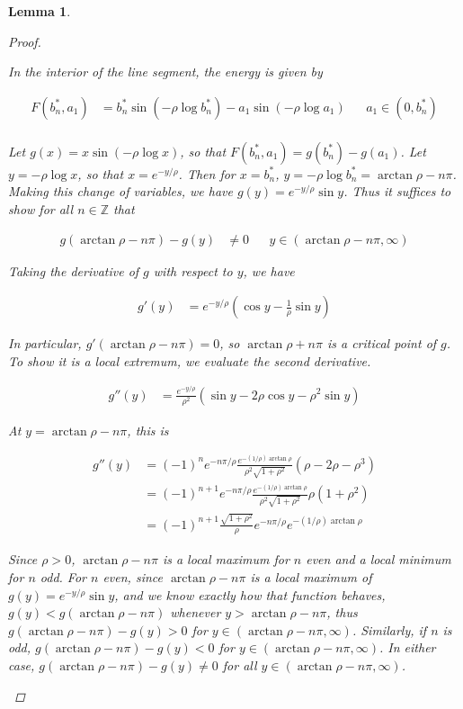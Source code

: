 \documentclass[12pt]{article}
\def\Z{{\mathbb Z}}
\newtheorem{lemma}{Lemma}
\begin{document}
\begin{lemma}
\begin{proof}
\begin{enumerate}
In the interior of the line segment, the energy is given by

\begin{align*}
F(b^*_n, a_1) &= b^*_n \sin(-\rho \log b^*_n) - a_1 \sin(-\rho \log a_1) && a_1 \in (0, b^*_n)\\
\end{align*}

Let $g(x) = x \sin(-\rho \log x)$, so that $F(b^*_n, a_1) = g(b^*_n) - g(a_1)$. Let $y = -\rho \log x$, so that $x = e^{-y/\rho}$. Then for $x = b^*_n$, $y = -\rho \log b^*_n = \arctan \rho - n \pi$. Making this change of variables, we have $g(y) = e^{-y/\rho} \sin y$. Thus it suffices to show for all $n \in \Z$ that

\begin{align*}
g(\arctan \rho - n \pi) - g(y) &\neq 0 && y \in (\arctan \rho - n \pi, \infty) 
\end{align*}

Taking the derivative of $g$ with respect to $y$, we have

\begin{align*}
g'(y) &= e^{-y/\rho}\left( \cos y - \frac{1}{\rho} \sin y \right)
\end{align*}

In particular, $g'(\arctan \rho - n \pi) = 0$, so $\arctan \rho + n \pi$ is a critical point of $g$. To show it is a local extremum, we evaluate the second derivative.

\begin{align*}
g''(y) &= \frac{e^{-y/\rho}}{\rho^2} \left( \sin y - 2 \rho \cos y - \rho^2 \sin y \right)
\end{align*}

At $y = \arctan \rho - n \pi$, this is

\begin{align*}
g''(y) &= (-1)^n e^{-n \pi /\rho} \frac{e^{-(1/\rho)\arctan \rho}}{\rho^2 \sqrt{1+\rho^2}} \left( \rho - 2\rho - \rho^3 \right) \\
&= (-1)^{n+1} e^{-n \pi /\rho} \frac{e^{-(1/\rho)\arctan \rho}}{\rho^2 \sqrt{1+\rho^2}} \rho \left( 1 + \rho^2 \right) \\
&= (-1)^{n+1} \frac{ \sqrt{1 + \rho^2}}{\rho} e^{-n \pi /\rho} e^{-(1/\rho)\arctan \rho}
\end{align*}

Since $\rho > 0$, $\arctan \rho - n \pi$ is a local maximum for $n$ even and a local minimum for $n$ odd. For $n$ even, since $\arctan \rho - n \pi$ is a local maximum of $g(y) = e^{-y/\rho} \sin y$, and we know exactly how that function behaves, $g(y) < g(\arctan \rho - n \pi)$ whenever $y > \arctan \rho - n \pi$, thus $g(\arctan \rho - n \pi) - g(y) > 0$ for $y \in (\arctan \rho - n \pi, \infty)$. Similarly, if $n$ is odd, $g(\arctan \rho - n \pi) - g(y) < 0$ for $y \in (\arctan \rho - n \pi, \infty)$. In either case, $g(\arctan \rho - n \pi) - g(y) \neq 0$ for all $y \in (\arctan \rho - n \pi, \infty)$.


\end{enumerate}
\end{proof}
\end{lemma}
\end{document}
